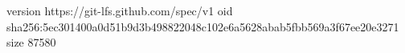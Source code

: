 version https://git-lfs.github.com/spec/v1
oid sha256:5ec301400a0d51b9d3b498822048c102e6a5628abab5fbb569a3f67ee20e3271
size 87580
